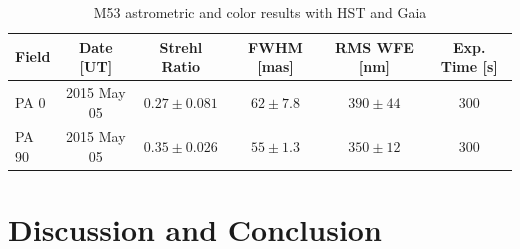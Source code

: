 \documentclass[]{spie}  %
\begin{document}
\begin{table}[!h]
\centering
\caption{M53 astrometric and color results with HST and Gaia} \label{tab:m53-AstromColor-results}
\begin{tabular}{lccccc}
\hline
        Field &  Date [UT] &  Strehl Ratio &  FWHM [mas] &  RMS WFE [nm] & Exp. Time [s] \\\hline\hline
        PA 0 & 2015 May 05 &  $0.27 \pm 0.081$ & $62 \pm 7.8$ & $390 \pm 44$ & 300\\
        PA 90 & 2015 May 05 & $0.35 \pm 0.026$ & $55 \pm 1.3$ & $350 \pm 12$ & 300\\\hline
\end{tabular}
\end{table}

\section{Discussion and Conclusion} \label{sec:conclusion}
\end{document}

